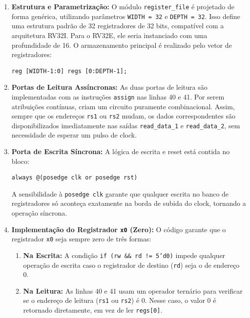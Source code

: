 \documentclass[12pt]{article}
\begin{document}
\begin{enumerate}
    \item \textbf{Estrutura e Parametrização:} 
    O módulo \texttt{register\_file} é projetado de forma genérica, utilizando parâmetros 
    \texttt{WIDTH = 32} e \texttt{DEPTH = 32}. Isso define uma estrutura padrão de 32 registradores de 32 bits, 
    compatível com a arquitetura RV32I. Para o RV32E, ele seria instanciado com uma profundidade de 16. 
    O armazenamento principal é realizado pelo vetor de registradores:
    \begin{verbatim}
reg [WIDTH-1:0] regs [0:DEPTH-1];
    \end{verbatim}

    \item \textbf{Portas de Leitura Assíncronas:} 
    As duas portas de leitura são implementadas com as instruções \texttt{assign} nas linhas 40 e 41. 
    Por serem atribuições contínuas, criam um circuito puramente combinacional. 
    Assim, sempre que os endereços \texttt{rs1} ou \texttt{rs2} mudam, os dados correspondentes 
    são disponibilizados imediatamente nas saídas \texttt{read\_data\_1} e \texttt{read\_data\_2}, 
    sem necessidade de esperar um pulso de clock.

    \item \textbf{Porta de Escrita Síncrona:} 
    A lógica de escrita e reset está contida no bloco:
    \begin{verbatim}
always @(posedge clk or posedge rst)
    \end{verbatim}
    A sensibilidade à \texttt{posedge clk} garante que qualquer escrita no banco de registradores 
    só aconteça exatamente na borda de subida do clock, tornando a operação síncrona.

    \item \textbf{Implementação do Registrador \texttt{x0} (Zero):} 
    O código garante que o registrador \texttt{x0} seja sempre zero de três formas:
    \begin{enumerate}
    \item \textbf{Na Escrita:}  
    A condição \texttt{if (rw \&\& rd != 5'd0)} impede qualquer operação de escrita 
    caso o registrador de destino (\texttt{rd}) seja o de endereço 0.

    \item \textbf{Na Leitura:}  
    As linhas 40 e 41 usam um operador ternário para verificar se o endereço de leitura 
    (\texttt{rs1} ou \texttt{rs2}) é 0. Nesse caso, o valor 0 é retornado diretamente, 
    em vez de ler \texttt{regs[0]}.


\end{enumerate}
\end{enumerate}
\end{document}
